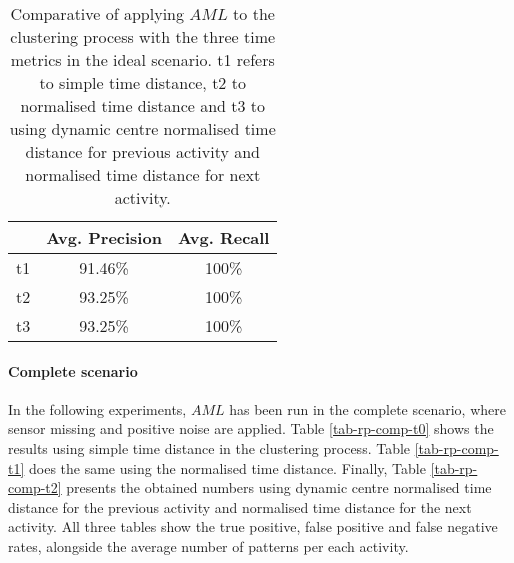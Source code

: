 \begin{table}[htbp]\scriptsize
\begin{center}
 \begin{tabular}{ccc}
  \hline
   & Avg. Precision & Avg. Recall \\
  \hline
  t1 & 91.46\% & 100\% \\
  t2 & 93.25\% & 100\% \\
  t3 & 93.25\% & 100\% \\
  \hline
 \end{tabular}
 \caption{Comparative of applying $AML$ to the clustering process with the three time metrics in the ideal scenario. t1 refers to simple time distance, t2 to normalised time distance and t3 to using dynamic centre normalised time distance for previous activity and normalised time distance for next activity.}
 \label{tab-aml-comparative-ideal}
\end{center} 
\end{table}

\paragraph*{Complete scenario}

In the following experiments, $AML$ has been run in the complete scenario, where sensor missing and positive noise are applied. Table \ref{tab-rp-comp-t0} shows the results using simple time distance in the clustering process. Table \ref{tab-rp-comp-t1} does the same using the normalised time distance. Finally, Table \ref{tab-rp-comp-t2} presents the obtained numbers using dynamic centre normalised time distance for the previous activity and normalised time distance for the next activity. All three tables show the true positive, false positive and false negative rates, alongside the average number of patterns per each activity.

